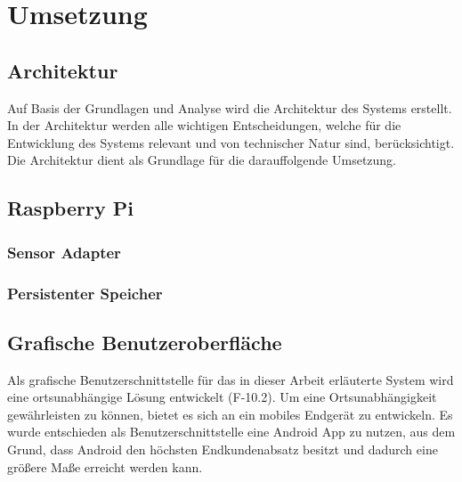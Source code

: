 \chapter{Umsetzung} \label{sec:Umsetzung}

\section{Architektur}
Auf Basis der Grundlagen und Analyse wird die Architektur des Systems erstellt.
In der Architektur werden alle wichtigen Entscheidungen, welche für die
Entwicklung des Systems relevant und von technischer Natur sind, berücksichtigt. Die Architektur dient als Grundlage für die darauffolgende Umsetzung.

\section{Raspberry Pi}
\subsection{Sensor Adapter}

\subsection{Persistenter Speicher}

\section{Grafische Benutzeroberfläche} %
Als grafische Benutzerschnittstelle für das in dieser Arbeit erläuterte System wird eine ortsunabhängige Lösung entwickelt (F-10.2). Um eine Ortsunabhängigkeit gewährleisten zu können, bietet es sich an ein mobiles Endgerät zu entwickeln. Es wurde  entschieden als Benutzerschnittstelle eine Android App zu nutzen, aus dem Grund, dass Android den höchsten Endkundenabsatz besitzt \cite{statista:marktanteileandroid} und dadurch eine größere Maße erreicht werden kann.
